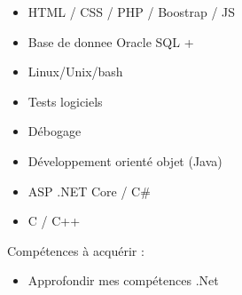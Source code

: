 \documentclass[letter,12pt]{exam}
\begin{document}
\begin{itemize}
\item HTML / CSS / PHP / Boostrap / JS

\item Base de donnee Oracle SQL +

\item Linux/Unix/bash

\item Tests logiciels

\item Débogage

\item Développement orienté objet (Java)

\item ASP .NET Core / C#

\item C / C++


\end{itemize}


Compétences à acquérir :

\begin{itemize}

\item Approfondir mes compétences .Net

\end{itemize}
\end{document}
